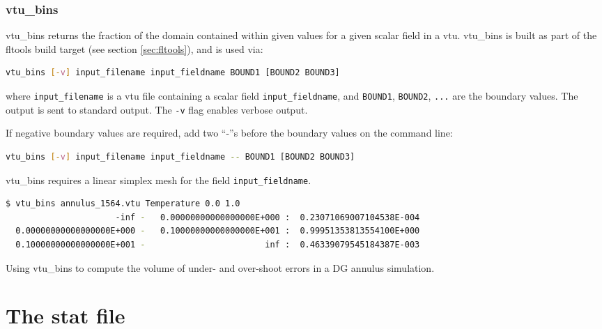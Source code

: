 
\subsubsection{vtu\_bins}
\label{sec:vtu_bins}

vtu\_bins returns the fraction of the domain contained within given values
for a given scalar field in a vtu. vtu\_bins is built as part of the fltools
build target (see section \ref{sec:fltools}), and is used via:

\begin{lstlisting}[language = Bash]
vtu_bins [-v] input_filename input_fieldname BOUND1 [BOUND2 BOUND3]
\end{lstlisting}

where \lstinline[language = Bash]+input_filename+ is a vtu file containing a scalar
field \lstinline[language = Bash]+input_fieldname+, and
\lstinline[language = Bash]+BOUND1+, \lstinline[language = Bash]+BOUND2+,
\lstinline[language = Bash]+...+ are the boundary values. The output is sent to
standard output. The \lstinline[language = Bash]+-v+ flag enables verbose output.

If negative boundary values are required, add two ``-''s before the boundary
values on the command line:

\begin{lstlisting}[language = Bash]
vtu_bins [-v] input_filename input_fieldname -- BOUND1 [BOUND2 BOUND3]
\end{lstlisting}

vtu\_bins requires a linear simplex mesh for the field
\lstinline[language = Bash]+input_fieldname+.

\begin{example}
  \begin{lstlisting}[language = Bash]
$ vtu_bins annulus_1564.vtu Temperature 0.0 1.0
                      -inf -   0.00000000000000000E+000 :  0.23071069007104538E-004
  0.00000000000000000E+000 -   0.10000000000000000E+001 :  0.99951353813554100E+000
  0.10000000000000000E+001 -                        inf :  0.46339079545184387E-003
  \end{lstlisting}%
\caption{Using vtu\_bins to compute the volume of under- and over-shoot errors in
         a DG annulus simulation.}
\end{example}


\section{The stat file}
\label{sec:diagnostics_stat_file}

